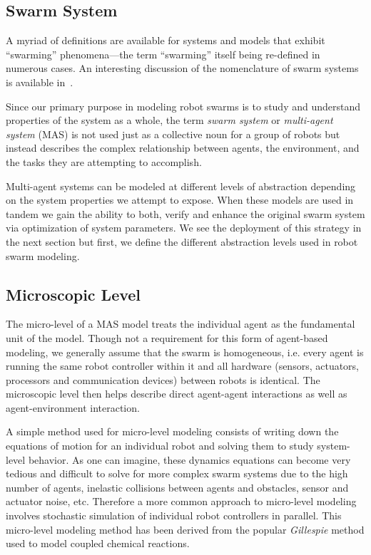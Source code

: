 \documentclass[Main.tex]{subfiles}
\begin{document}
\subsection{Swarm System}
A myriad of definitions are available for systems and models that exhibit ``swarming'' phenomena---the term ``swarming'' itself being re-defined in numerous cases. An interesting discussion of the nomenclature of swarm systems is available in~\cite{Beni2005, Beni2005a}.

Since our primary purpose in modeling robot swarms is to study and understand properties of the system as a whole, the term \emph{swarm system} or \emph{multi-agent system} (MAS) is not used just as a collective noun for a group of robots but instead describes the complex relationship between agents, the environment, and the tasks they are attempting to accomplish.

Multi-agent systems can be modeled at different levels of abstraction depending on the system properties we attempt to expose. When these models are used in tandem we gain the ability to both, verify and enhance the original swarm system via optimization of system parameters. We see the deployment of this strategy in the next section but first, we define the different abstraction levels used in robot swarm modeling.


\subsection{Microscopic Level}
The micro-level of a MAS model treats the individual agent as the fundamental unit of the model\cite{Lerman2001a}. Though not a requirement for this form of agent-based modeling, we generally assume that the swarm is homogeneous, i.e. every agent is running the same robot controller within it and all hardware (sensors, actuators, processors and communication devices) between robots is identical. The microscopic level then helps describe direct agent-agent interactions as well as agent-environment interaction. 

A simple method used for micro-level modeling consists of writing down the equations of motion for an individual robot and solving them to study system-level behavior. As one can imagine, these dynamics equations can become very tedious and difficult to solve for more complex swarm systems due to the high number of agents, inelastic collisions between agents and obstacles, sensor and actuator noise, etc. Therefore a more common approach to micro-level modeling involves stochastic simulation of individual robot controllers in parallel. This micro-level modeling method has been derived from the popular \emph{Gillespie} method\cite{Gillespie1976, Gillespie1977} used to model coupled chemical reactions.
\end{document}
